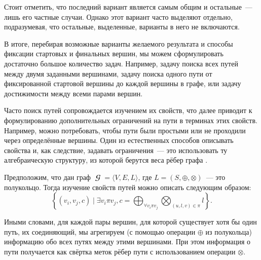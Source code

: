 Стоит отметить, что последний вариант является самым общим и остальные~--- лишь его частные случаи.
Однако этот вариант часто выделяют отдельно, подразумевая, что остальные, выделенные, варианты в него не включаются.

В итоге, перебирая возможные варианты желаемого результата и способы фиксации стартовых и финальных вершин, мы можем сформулировать достаточно большое количество задач.
Например, задачу поиска всех путей между двумя заданными вершинами, задачу поиска одного пути от фиксированной стартовой вершины до каждой вершины в графе, или задачу достижимости между всеми парами вершин.

Часто поиск путей сопровождается изучением их свойств, что далее приводит к формулированию дополнительных ограничений на пути в терминах этих свойств.
Например, можно потребовать, чтобы пути были простыми или не проходили через определённые вершины.
Один из естественных способов описывать свойства и, как следствие, задавать ограничения~--- это использовать ту алгебраическую структуру, из которой берутся веса рёбер графа%
.

Предположим, что дан граф $\mbfscrG = \langle V, E, L\rangle $, где $L = (S, \oplus, \otimes)$~--- это полукольцо.
Тогда изучение свойств путей можно описать следующим образом:
\begin{equation}
    \label{eq:algPathProblem}
    \left\{(v_i, v_j, c) \mid \exists v_i \pi v_j, c = \bigoplus_{\forall v_i \pi v_j} \bigotimes_{(u, l, v) \in \pi } l\right\}.
\end{equation}

Иными словами, для каждой пары вершин, для которой существует хотя бы один путь, их соединяющий, мы агрегируем (с помощью операции $\oplus$ из полукольца) информацию обо всех путях между этими вершинами.
При этом информация о пути получается как свёртка меток рёбер пути с использованием операции $\otimes$.

